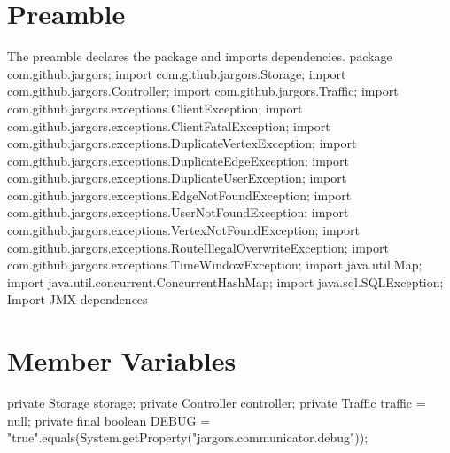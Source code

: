 \section{Preamble}
The preamble declares the package and imports dependencies.
\nwenddocs{}\endmoddef{}
package com.github.jargors;
\nwendcode{}\nwdocspar
\nwenddocs{}\plusendmoddef
import com.github.jargors.Storage;
import com.github.jargors.Controller;
import com.github.jargors.Traffic;
import com.github.jargors.exceptions.ClientException;
import com.github.jargors.exceptions.ClientFatalException;
import com.github.jargors.exceptions.DuplicateVertexException;
import com.github.jargors.exceptions.DuplicateEdgeException;
import com.github.jargors.exceptions.DuplicateUserException;
import com.github.jargors.exceptions.EdgeNotFoundException;
import com.github.jargors.exceptions.UserNotFoundException;
import com.github.jargors.exceptions.VertexNotFoundException;
import com.github.jargors.exceptions.RouteIllegalOverwriteException;
import com.github.jargors.exceptions.TimeWindowException;
import java.util.Map;
import java.util.concurrent.ConcurrentHashMap;
import java.sql.SQLException;
\LA{}Import JMX dependences~{\nwtagstyle{}}\RA{}
\nwendcode{}\nwdocspar

\section{Member Variables}
\nwenddocs{}\endmoddef{}
private Storage storage;
private Controller controller;
private Traffic traffic = null;
private final boolean DEBUG = "true".equals(System.getProperty("jargors.communicator.debug"));
\nwendcode{}\nwdocspar

